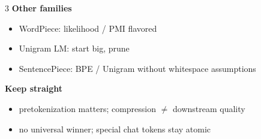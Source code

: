 \documentclass[10pt,landscape]{article}
\newcommand{\mini}[1]{\textbf{#1}}
\begin{document}
\begin{multicols}{3}
\mini{Other families}
\begin{itemize}
\item WordPiece: likelihood / PMI flavored
\item Unigram LM: start big, prune
\item SentencePiece: BPE / Unigram without whitespace assumptions
\end{itemize}

\mini{Keep straight}
\begin{itemize}
\item pretokenization matters; compression \(\neq\) downstream quality
\item no universal winner; special chat tokens stay atomic
\end{itemize}

\end{multicols}
\end{document}
